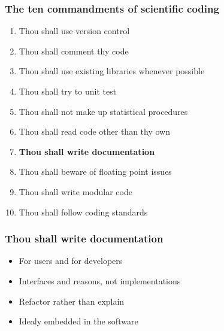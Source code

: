 \documentclass[slidestop]{beamer}
\begin{document}
\begin{frame}
  \frametitle{The ten commandments of scientific coding}
  \begin{enumerate}
    \item Thou shall use version control
    \item Thou shall comment thy code
    \item Thou shall use existing libraries whenever possible
    \item Thou shall try to unit test
    \item Thou shall not make up statistical procedures
    \item Thou shall read code other than thy own
    \item {\bf Thou shall write documentation}
    \item Thou shall beware of floating point issues
    \item Thou shall write modular code
    \item Thou shall follow coding standards
  \end{enumerate}
\end{frame}

{
  \frame{}
}

\begin{frame}
  \frametitle{Thou shall write documentation}
  \begin{itemize}[<+->]
    \item For users and for developers
    \item Interfaces and reasons, not implementations
    \item Refactor rather than explain
    \item Idealy embedded in the software
  \end{itemize}
\end{frame}
\end{document}
